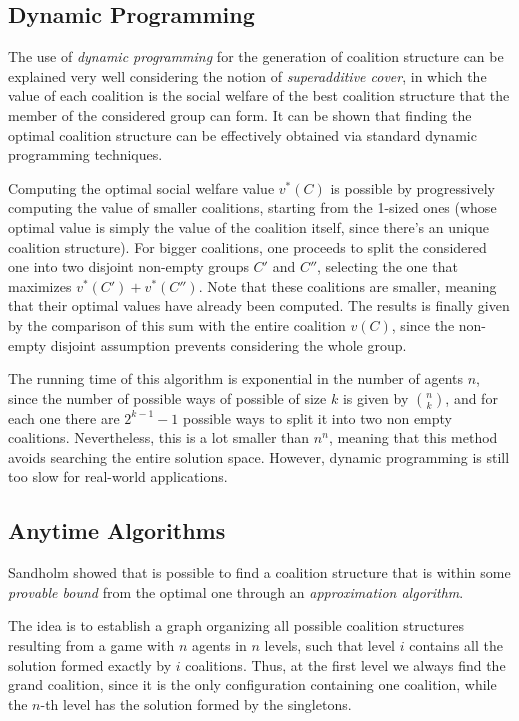 \documentclass[11pt, twoside, titlepage, a4paper, openright]{report}
\begin{document}
\subsection{Dynamic Programming}

The use of \textit{dynamic programming} for the generation of coalition structure \cite{Rothkopf98computationallymanageable} can be explained very well considering the notion of \textit{superadditive cover}, in which the value of each coalition is the social welfare of the best coalition structure that the member of the considered group can form. It can be shown that finding the optimal coalition structure can be effectively obtained via standard dynamic programming techniques.

Computing the optimal social welfare value $v^*(C)$ is possible by progressively computing the value of smaller coalitions, starting from the 1-sized ones (whose optimal value is simply the value of the coalition itself, since there's an unique coalition structure). 
For bigger coalitions, one proceeds to split the considered one into two disjoint non-empty groups $C'$ and $C''$, selecting the one that maximizes $v^*(C')+v^*(C'')$. Note that these coalitions are smaller, meaning that their optimal values have already been computed. The results is finally given by the comparison of this sum with the entire coalition $v(C)$, since the non-empty disjoint assumption prevents considering the whole group.

The running time of this algorithm is exponential in the number of agents $n$, since the number of possible ways of possible of size $k$ is given by $\binom{n}{k}$, and for each one there are $2^{k-1}-1$ possible ways to split it into two non empty coalitions. Nevertheless, this is a lot smaller than $n^n$, meaning that this method avoids searching the entire solution space. However, dynamic programming is still too slow for real-world applications.

\subsection{Anytime Algorithms}

Sandholm \cite{Sandholm99coalitionstructure} showed that is possible to find a coalition structure that is within some \textit{provable bound} from the optimal one through an \textit{approximation algorithm}.

The idea is to establish a graph organizing all possible coalition structures resulting from a game with $n$ agents in $n$ levels, such that level $i$ contains all the solution formed exactly by $i$ coalitions. Thus, at the first level we always find the grand coalition, since it is the only configuration containing one coalition, while the $n$-th level has the solution formed by the singletons.
\end{document}
